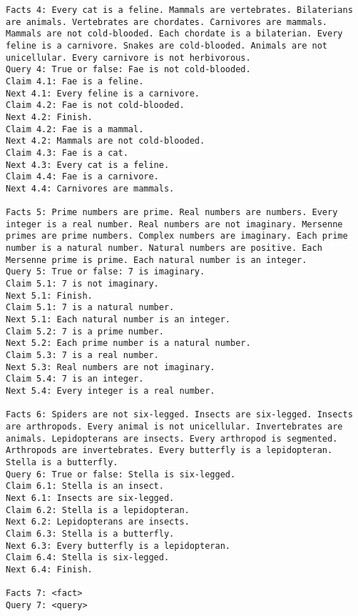 \begin{lstlisting}[breaklines=true,breakatwhitespace=true]
Facts 4: Every cat is a feline. Mammals are vertebrates. Bilaterians are animals. Vertebrates are chordates. Carnivores are mammals. Mammals are not cold-blooded. Each chordate is a bilaterian. Every feline is a carnivore. Snakes are cold-blooded. Animals are not unicellular. Every carnivore is not herbivorous.
Query 4: True or false: Fae is not cold-blooded.
Claim 4.1: Fae is a feline.
Next 4.1: Every feline is a carnivore.
Claim 4.2: Fae is not cold-blooded.
Next 4.2: Finish.
Claim 4.2: Fae is a mammal.
Next 4.2: Mammals are not cold-blooded.
Claim 4.3: Fae is a cat.
Next 4.3: Every cat is a feline.
Claim 4.4: Fae is a carnivore.
Next 4.4: Carnivores are mammals.

Facts 5: Prime numbers are prime. Real numbers are numbers. Every integer is a real number. Real numbers are not imaginary. Mersenne primes are prime numbers. Complex numbers are imaginary. Each prime number is a natural number. Natural numbers are positive. Each Mersenne prime is prime. Each natural number is an integer.
Query 5: True or false: 7 is imaginary.
Claim 5.1: 7 is not imaginary.
Next 5.1: Finish.
Claim 5.1: 7 is a natural number.
Next 5.1: Each natural number is an integer.
Claim 5.2: 7 is a prime number.
Next 5.2: Each prime number is a natural number.
Claim 5.3: 7 is a real number.
Next 5.3: Real numbers are not imaginary.
Claim 5.4: 7 is an integer.
Next 5.4: Every integer is a real number.

Facts 6: Spiders are not six-legged. Insects are six-legged. Insects are arthropods. Every animal is not unicellular. Invertebrates are animals. Lepidopterans are insects. Every arthropod is segmented. Arthropods are invertebrates. Every butterfly is a lepidopteran. Stella is a butterfly.
Query 6: True or false: Stella is six-legged.
Claim 6.1: Stella is an insect.
Next 6.1: Insects are six-legged.
Claim 6.2: Stella is a lepidopteran.
Next 6.2: Lepidopterans are insects.
Claim 6.3: Stella is a butterfly.
Next 6.3: Every butterfly is a lepidopteran.
Claim 6.4: Stella is six-legged.
Next 6.4: Finish.

Facts 7: <fact>
Query 7: <query>
\end{lstlisting}


